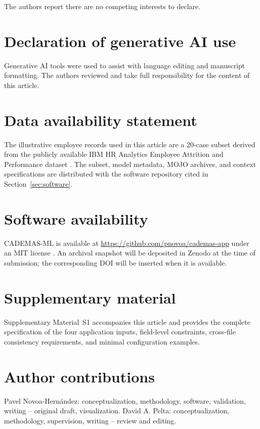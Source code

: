 \documentclass{interact}
\begin{document}
The authors report there are no competing interests to declare.

\section*{Declaration of generative AI use}

Generative AI tools were used to assist with language editing and manuscript formatting. The authors reviewed and take full responsibility for the content of this article.

\section*{Data availability statement}

The illustrative employee records used in this article are a 20-case subset derived from the publicly available IBM HR Analytics Employee Attrition and Performance dataset \citep{IBMHRKaggle}. The subset, model metadata, MOJO archives, and context specifications are distributed with the software repository cited in Section~\ref{sec:software}.

\section*{Software availability}\label{sec:software}

CADEMAS-ML is available at \url{https://github.com/pnovoa/cademas-app} under an MIT license \citep{cademasml2026}. An archival snapshot will be deposited in Zenodo at the time of submission; the corresponding DOI will be inserted when it is available.

\section*{Supplementary material}

Supplementary Material~S1 accompanies this article and provides the complete specification of the four application inputs, field-level constraints, cross-file consistency requirements, and minimal configuration examples.

\section*{Author contributions}

Pavel Novoa-Hern\'{a}ndez: conceptualization, methodology, software, validation, writing -- original draft, visualization. David A. Pelta: conceptualization, methodology, supervision, writing -- review and editing.
\end{document}
